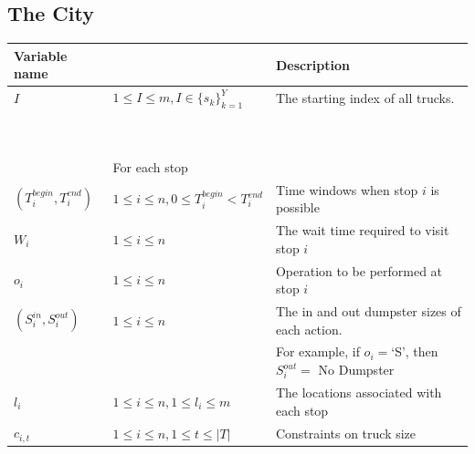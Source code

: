 \documentclass{article}
\begin{document}
\subsection{The City}
\begin{tabular}{ l | l | l }
 Variable name                 &                                                                & Description                                                   \\
 \hline
  $I$                          & $ 1 \le I \le m, I \in \{s_k\}_{k=1}^Y                      $  & The starting index of all trucks.                             \\
                               & $                                                           $  &                                                               \\
                               & $                                                           $  &                                                               \\
                               & For each stop                                                  &                                                               \\
  $(T^{begin}_i, T^{end}_i)$   & $  1 \le i \le n, 0\le T^{begin}_i< T^{end}_i               $  & Time windows when stop $i$ is possible                        \\
  $W_i$                        & $  1 \le i \le n                                            $  & The wait time required to visit stop $i$                      \\
  $o_i$                        & $  1 \le i \le n                                            $  & Operation to be performed at stop $i$                         \\
  $(S^{in}_i, S^{out}_i)$      & $  1 \le i \le n                                            $  & The in and out dumpster sizes of each action.                 \\
                               & $                                                           $  & For example, if $o_i = $`S', then $S_i^{out} = $ No Dumpster  \\
  $l_i$                        & $  1 \le i \le n, 1 \le l_i \le m                           $  & The locations associated with each stop                       \\
  $c_{i,t}$                    & $  1 \le i \le n, 1 \le t \le |T|                           $  & Constraints on truck size                                     \\

\end{tabular}
\end{document}
